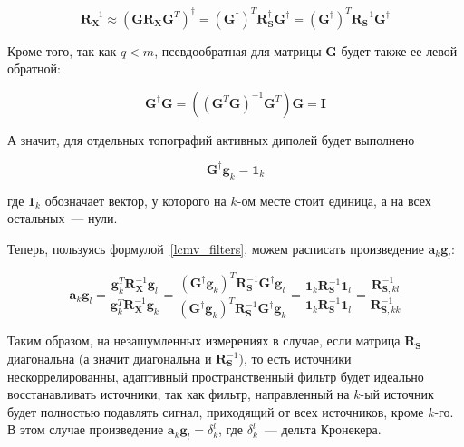 \begin{equation}
    \mathbf{R}_\mathbf{X}^{-1} \approx (\mathbf{G} \mathbf{R}_\mathbf{X} \mathbf{G}^T)^\dagger =
    (\mathbf{G}^\dagger)^T \mathbf{R}_\mathbf{S}^\dagger \mathbf{G}^\dagger = 
    (\mathbf{G}^\dagger)^T \mathbf{R}_\mathbf{S}^{-1} \mathbf{G}^\dagger
\end{equation}

Кроме того, так как $q < m$, псевдообратная для матрицы $\mathbf{G}$ будет также ее левой обратной:

\begin{equation}
    \mathbf{G}^\dagger \mathbf{G} = ((\mathbf{G}^T \mathbf{G})^{-1} \mathbf{G}^T) \mathbf{G} = \mathbf{I}
\end{equation}

А значит, для отдельных топографий активных диполей будет выполнено

\begin{equation}
    \mathbf{G}^\dagger \mathbf{g}_k = \mathbf{1}_k
\end{equation}

где $\mathbf{1}_k$ обозначает вектор, у которого на $k$-ом месте стоит единица,
а на всех остальных~--- нули.

Теперь, пользуясь формулой~\ref{lcmv_filters}, можем расписать произведение
$\mathbf{a}_k \mathbf{g}_l$:

\begin{equation}
    \mathbf{a}_k \mathbf{g}_l = \frac{\mathbf{g}_k^T \mathbf{R}_\mathbf{X}^{-1}\mathbf{g}_l}
                                   {\mathbf{g}_k^T \mathbf{R}_\mathbf{X}^{-1} \mathbf{g}_k}=
       \frac{(\mathbf{G}^\dagger\mathbf{g}_k)^T \mathbf{R}_\mathbf{S}^{-1} \mathbf{G}^\dagger \mathbf{g}_l}
            {(\mathbf{G}^\dagger\mathbf{g}_k)^T \mathbf{R}_\mathbf{S}^{-1} \mathbf{G}^\dagger \mathbf{g}_k}=
       \frac{\mathbf{1}_k \mathbf{R}_\mathbf{S}^{-1} \mathbf{1}_l}
            {\mathbf{1}_k \mathbf{R}_\mathbf{S}^{-1} \mathbf{1}_l} =
            \frac{\mathbf{R}_{\mathbf{S}, kl}^{-1}}
                 {\mathbf{R}_{\mathbf{S}, kk}^{-1}}
\end{equation}

Таким образом, на незашумленных измерениях в случае, если матрица $\mathbf{R}_\mathbf{S}$ диагональна
(а значит диагональна и $\mathbf{R}_\mathbf{S}^{-1}$),
то есть источники нескоррелированны, адаптивный пространственный фильтр
будет идеально восстанавливать источники, так как фильтр, направленный на $k$-ый источник
будет полностью подавлять сигнал, приходящий от всех источников, кроме $k$-го.
В этом случае произведение $\mathbf{a}_k \mathbf{g}_l = \delta_k^l$, где $\delta_k^l$~--- дельта Кронекера.

